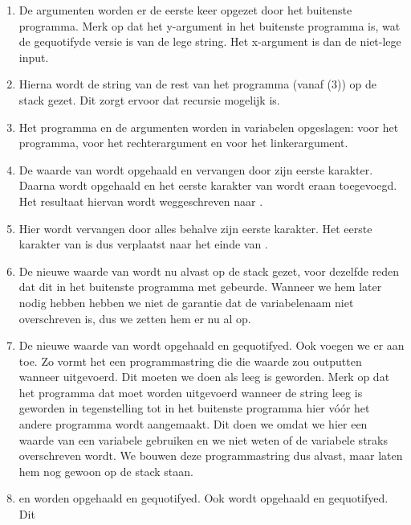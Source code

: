 \begin{enumerate}
	\item De argumenten worden er de eerste keer opgezet door het buitenste
		programma. Merk op dat het y-argument in het buitenste programma
		 is, wat de gequotifyde
		versie is van de lege string. Het x-argument is dan de niet-lege input.
	\item Hierna wordt de string van de rest van het programma (vanaf (3)) op de
		stack gezet. Dit zorgt ervoor dat recursie mogelijk is.
	\item Het programma en de argumenten worden in variabelen opgeslagen:
		 voor het programma,  voor het
		rechterargument en  voor het linkerargument.
	\item De waarde van  wordt opgehaald en vervangen door
		zijn eerste karakter. Daarna wordt  opgehaald en het
		eerste karakter van  wordt eraan toegevoegd. Het
		resultaat hiervan wordt weggeschreven naar .
	\item Hier wordt  vervangen door alles behalve zijn
		eerste karakter. Het eerste karakter van  is dus
		verplaatst naar het einde van .
	\item De nieuwe waarde van  wordt nu alvast op de stack
		gezet, voor dezelfde reden dat dit in het buitenste programma met
		 gebeurde.  Wanneer we hem later nodig hebben hebben we
		niet de garantie dat de variabelenaam niet overschreven is, dus we zetten
		hem er nu al op.
	\item De nieuwe waarde van  wordt opgehaald en gequotifyed.
		Ook voegen we  er aan toe. Zo vormt het een programmastring
		die die waarde zou outputten wanneer uitgevoerd. Dit moeten we doen als
		 leeg is geworden. Merk op dat het programma dat moet
		worden uitgevoerd wanneer de string leeg is geworden in tegenstelling tot
		in het buitenste programma hier v\'{o}\'{o}r het andere programma wordt
		aangemaakt. Dit doen we omdat we hier een waarde van een variabele
		gebruiken en we niet weten of de variabele straks overschreven wordt.  We
		bouwen deze programmastring dus alvast, maar laten hem nog gewoon op de
		stack staan.
	\item {} en  worden opgehaald en
		gequotifyed. Ook  wordt opgehaald en gequotifyed. Dit

\end{enumerate}
